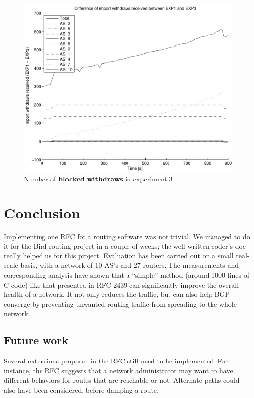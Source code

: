 \documentclass[a4paper,english]{IEEEtran}
\begin{document}
\begin{figure}
\begin{center}
\includegraphics[scale=.5]{img/diff_exp1_exp3_withdraws.pdf}
\end{center}
\caption{Number of \textbf{blocked withdraws} in experiment 3}
\label{fig_diff_withdraws}
\end{figure}

\section{Conclusion}

Implementing one RFC for a routing software was not trivial. We managed to do it for the Bird routing project 
in a couple of weeks; the well-written coder's doc\cite{codersdoc} really helped us for this project.
Evaluation has been carried out on a small real-scale basis, with a network of 10 AS's and 27 routers. 
The measurements and corresponding analysis have shown that a ``simple'' method (around 1000 lines of C code) 
like that presented in RFC 2439 can significantly improve the overall health of a network.
It not only reduces the traffic, but can also help BGP converge by preventing unwanted routing traffic from 
spreading to the whole network.

\subsection{Future work}

Several extensions proposed in the RFC still need to be implemented.
For instance, the RFC suggests that a network administrator may want to have different behaviors for routes that 
are reachable or not. Alternate paths could also have been considered, before damping a route.
\end{document}
